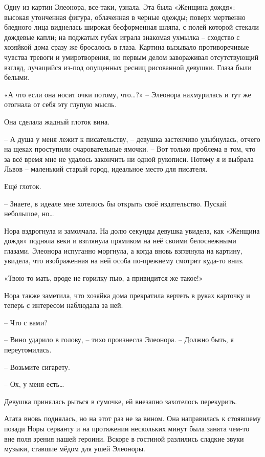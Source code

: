 \documentclass[
  a5paperpaper,
  DIV=11,
  numbers=noendperiod]{scrreprt}
\begin{document}
Одну из картин Элеонора, все-таки, узнала. Эта была «Женщина дождя»:
высокая утонченная фигура, облаченная в черные одежды; поверх мертвенно
бледного лица виднелась широкая бесформенная шляпа, с полей которой
стекали дождевые капли; на поджатых губах играла знакомая ухмылка --
сходство с хозяйкой дома сразу же бросалось в глаза. Картина вызывало
противоречивые чувства тревоги и умиротворения, но первым делом
завораживал отсутствующий взгляд, лучащийся из-под опущенных ресниц
рисованной девушки. Глаза были белыми.

«А что если она носит очки потому, что\ldots?» -- Элеонора нахмурилась и
тут же отогнала от себя эту глупую мысль.

Она сделала жадный глоток вина.

-- А душа у меня лежит к писательству, -- девушка застенчиво улыбнулась,
отчего на щеках проступили очаровательные ямочки. -- Вот только проблема
в том, что за всё время мне не удалось закончить ни одной рукописи.
Потому я и выбрала Львов -- маленький старый город, идеальное место для
писателя.

Ещё глоток.

-- Знаете, в идеале мне хотелось бы открыть своё издательство. Пускай
небольшое, но\ldots{}

Нора вздрогнула и замолчала. На долю секунды девушка увидела, как
«Женщина дождя» подняла веки и взглянула прямиком на неё своими
белоснежными глазами. Элеонора испуганно моргнула, а когда вновь
взглянула на картину, увидела, что изображенная на ней особа по-прежнему
смотрит куда-то вниз.

«Твою-то мать, вроде не горилку пью, а привидится же такое!»

Нора также заметила, что хозяйка дома прекратила вертеть в руках
карточку и теперь с интересом наблюдала за ней.

-- Что с вами?

-- Вино ударило в голову, -- тихо произнесла Элеонора. -- Должно быть, я
переутомилась.

-- Возьмите сигарету.

-- Ох, у меня есть\ldots{}

Девушка принялась рыться в сумочке, ей внезапно захотелось перекурить.

Агата вновь поднялась, но на этот раз не за вином. Она направилась к
стоявшему позади Норы серванту и на протяжении нескольких минут была
занята чем-то вне поля зрения нашей героини. Вскоре в гостиной разлились
сладкие звуки музыки, ставшие мёдом для ушей Элеоноры.
\end{document}
